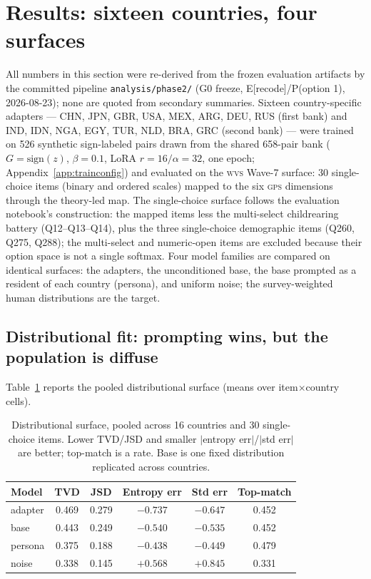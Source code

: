 \documentclass[10pt,letterpaper]{article}
\newcommand{\WVS}{\textsc{wvs}}
\newcommand{\GPS}{\textsc{gps}}
\begin{document}
\section{Results: sixteen countries, four surfaces}
All numbers in this section were re-derived from the frozen evaluation artifacts by the committed pipeline \texttt{analysis/phase2/} (G0 freeze, E[recode]/P(option 1), 2026-08-23); none are quoted from secondary summaries. Sixteen country-specific adapters --- CHN, JPN, GBR, USA, MEX, ARG, DEU, RUS (first bank) and IND, IDN, NGA, EGY, TUR, NLD, BRA, GRC (second bank) --- were trained on 526 synthetic sign-labeled pairs drawn from the shared 658-pair bank ($G=\mathrm{sign}(z)$, $\beta=0.1$, LoRA $r=16/\alpha=32$, one epoch; Appendix~\ref{app:trainconfig}) and evaluated on the \WVS{} Wave-7 surface: 30 single-choice items (binary and ordered scales) mapped to the six \GPS{} dimensions through the theory-led map. The single-choice surface follows the evaluation notebook's construction: the mapped items less the multi-select childrearing battery (Q12--Q13--Q14), plus the three single-choice demographic items (Q260, Q275, Q288); the multi-select and numeric-open items are excluded because their option space is not a single softmax. Four model families are compared on identical surfaces: the adapters, the unconditioned base, the base prompted as a resident of each country (persona), and uniform noise; the survey-weighted human distributions are the target.

\subsection{Distributional fit: prompting wins, but the population is diffuse}
Table~\ref{tab:res-distributional} reports the pooled distributional surface (means over item$\times$country cells).

\begin{table}[H]
\centering\small
\caption{Distributional surface, pooled across 16 countries and 30 single-choice items. Lower TVD/JSD and smaller $|$entropy err$|$/$|$std err$|$ are better; top-match is a rate. Base is one fixed distribution replicated across countries.}\label{tab:res-distributional}
\begin{tabular}{lccccc}
\toprule
Model & TVD & JSD & Entropy err & Std err & Top-match\\
\midrule
adapter & 0.469 & 0.279 & $-0.737$ & $-0.647$ & 0.452\\
base & 0.443 & 0.249 & $-0.540$ & $-0.535$ & 0.452\\
persona & 0.375 & 0.188 & $-0.438$ & $-0.449$ & 0.479\\
noise & 0.338 & 0.145 & $+0.568$ & $+0.845$ & 0.331\\
\bottomrule
\end{tabular}
\end{table}
\end{document}
